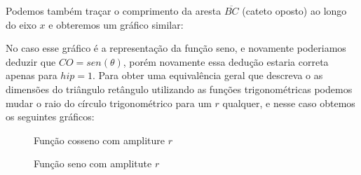 \begin{multicols*}{2}
    Podemos também traçar o comprimento da aresta $\overline{BC}$ (cateto oposto)
    ao longo do eixo $x$ e obteremos um gráfico similar:
    \begin{figure}[H]
        \centering
    \end{figure}

    No caso esse gráfico é a representação da função seno, e novamente poderiamos
    deduzir que $CO = sen(\theta)$, porém novamente essa dedução estaria correta
    apenas para $hip = 1$. Para obter uma equivalência geral que descreva o
    as dimensões do triângulo retângulo utilizando as funções trigonométricas
    podemos mudar o raio do círculo trigonométrico para um $r$ qualquer,
    e nesse caso obtemos os seguintes gráficos:

    \begin{figure}[H]
        \centering
        \caption{Função cosseno com ampliture $r$}
    \end{figure}

    \begin{figure}[H]
        \centering
        \caption{Função seno com amplitute $r$}
    \end{figure}


\end{multicols*}
